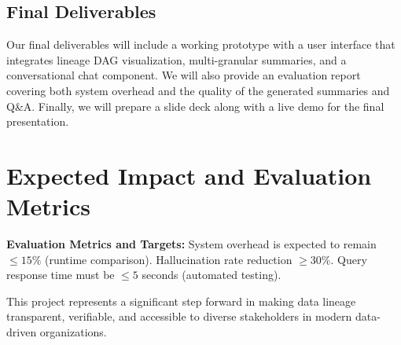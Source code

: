 \documentclass[9pt,letterpaper]{article}
\begin{document}
\subsection{Final Deliverables}
Our final deliverables will include a working prototype with a user interface that integrates lineage DAG visualization, multi-granular summaries, and a conversational chat component. We will also provide an evaluation report covering both system overhead and the quality of the generated summaries and Q\&A. Finally, we will prepare a slide deck along with a live demo for the final presentation.



\section{Expected Impact and Evaluation Metrics}

\noindent \textbf{Evaluation Metrics and Targets:}
System overhead is expected to remain  $\leq 15\%$ (runtime comparison).
Hallucination rate reduction $\geq 30\%$.
Query response time must be $\leq 5$ seconds (automated testing).
\vspace{0.2cm}

This project represents a significant step forward in making data lineage transparent,
verifiable, and accessible to diverse stakeholders in modern data-driven organizations.



\end{document}
